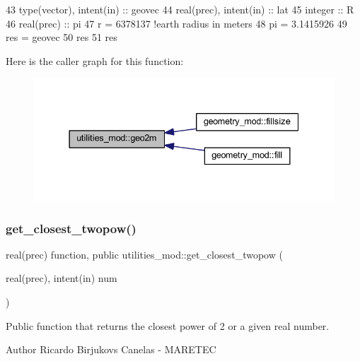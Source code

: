 \begin{DoxyCode}
43     \textcolor{keywordtype}{type}(vector), \textcolor{keywordtype}{intent(in)} :: geovec
44     \textcolor{keywordtype}{real(prec)}, \textcolor{keywordtype}{intent(in)} :: lat
45     \textcolor{keywordtype}{integer} :: R
46     \textcolor{keywordtype}{real(prec)} :: pi
47     r = 6378137 \textcolor{comment}{!earth radius in meters}
48     pi = 3.1415926
49     res = geovec
50     res%
51     res%
\end{DoxyCode}
Here is the caller graph for this function\+:\nopagebreak
\begin{figure}[H]
\begin{center}
\leavevmode
\includegraphics[width=337pt]{namespaceutilities__mod_a415de70150d626b1e8c6e0c8c0e09e8b_icgraph}
\end{center}
\end{figure}
\mbox{\label{namespaceutilities__mod_a683f93677348e11d331c1c37c66caf7a}} 
\subsubsection{\texorpdfstring{get\+\_\+closest\+\_\+twopow()}{get\_closest\_twopow()}}
{\footnotesize\ttfamily real(prec) function, public utilities\+\_\+mod\+::get\+\_\+closest\+\_\+twopow (\begin{DoxyParamCaption}\item[{real(prec), intent(in)}]{num }\end{DoxyParamCaption})}



Public function that returns the closest power of 2 or a given real number. 

\begin{DoxyAuthor}{Author}
Ricardo Birjukovs Canelas -\/ M\+A\+R\+E\+T\+EC 
\end{DoxyAuthor}

